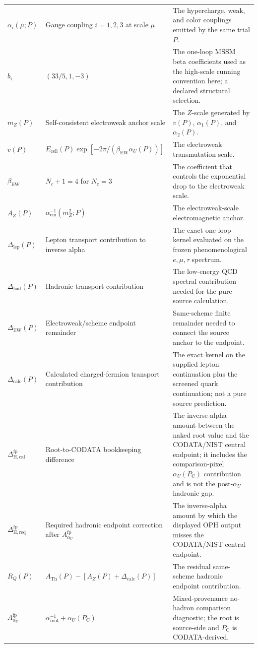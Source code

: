 \documentclass[11pt]{article}
\theoremstyle{remark}
\newcommand{\ATh}{A_{\mathrm{Th}}}
\newcommand{\AZ}{A_Z}
\newcommand{\Ppub}{P_{\mathrm C}}
\newcommand{\Rq}{R_Q}
\newcommand{\Dcalc}{\Delta_{\mathrm{calc}}}
\newcommand{\Dcalib}{\Delta_{\mathrm{H,cal}}}
\newcommand{\Dlep}{\Delta_{\mathrm{lep}}}
\newcommand{\Dhad}{\Delta_{\mathrm{had}}}
\newcommand{\DEW}{\Delta_{\mathrm{EW}}}
\newcommand{\Dhadreq}{\Delta_{\mathrm{H,req}}}
\newcommand{\Nc}{N_c}
\begin{document}
\begin{longtable}{@{}L{0.20\textwidth}L{0.32\textwidth}L{0.38\textwidth}@{}}
\(\alpha_i(\mu;P)\) & Gauge coupling \(i=1,2,3\) at scale \(\mu\) & The hypercharge, weak, and color couplings emitted by the same trial \(P\). \\
\(b_i\) & \((33/5,1,-3)\) & The one-loop MSSM beta coefficients used as the high-scale running convention here; a declared structural selection. \\
\(m_Z(P)\) & Self-consistent electroweak anchor scale & The \(Z\)-scale generated by \(v(P)\), \(\alpha_1(P)\), and \(\alpha_2(P)\). \\
\(v(P)\) & \(E_{\mathrm{cell}}(P)\exp[-2\pi/(\beta_{\mathrm{EW}}\alpha_U(P))]\) & The electroweak transmutation scale. \\
\(\beta_{\mathrm{EW}}\) & \(\Nc+1=4\) for \(\Nc=3\) & The coefficient that controls the exponential drop to the electroweak scale. \\
\(\AZ(P)\) & \(\alpha_{\mathrm{em}}^{-1}(m_Z^2;P)\) & The electroweak-scale electromagnetic anchor. \\
\(\Dlep(P)\) & Lepton transport contribution to inverse alpha & The exact one-loop kernel evaluated on the frozen phenomenological \(e,\mu,\tau\) spectrum. \\
\(\Dhad(P)\) & Hadronic transport contribution & The low-energy QCD spectral contribution needed for the pure source calculation. \\
\(\DEW(P)\) & Electroweak/scheme endpoint remainder & Same-scheme finite remainder needed to connect the source anchor to the endpoint. \\
\(\Dcalc(P)\) & Calculated charged-fermion transport contribution & The exact kernel on the supplied lepton continuation plus the screened quark continuation; not a pure source prediction. \\
\(\Dcalib^{\mathrm{fp}}\) & Root-to-CODATA bookkeeping difference & The inverse-alpha amount between the naked root value and the CODATA/NIST central endpoint; it includes the comparison-pixel \(\alpha_U(\Ppub)\) contribution and is not the post-\(\alpha_U\) hadronic gap. \\
\(\Dhadreq^{\mathrm{fp}}\) & Required hadronic endpoint correction after \(A_{\alpha_U}^{\mathrm{fp}}\) & The inverse-alpha amount by which the displayed OPH output misses the CODATA/NIST central endpoint. \\
\(\Rq(P)\) & \(\ATh(P)-[\AZ(P)+\Dcalc(P)]\) & The residual same-scheme hadronic endpoint contribution. \\
\(A_{\alpha_U}^{\mathrm{fp}}\) & \(\alpha_{\mathrm{root}}^{-1}+\alpha_U(\Ppub)\) & Mixed-provenance no-hadron comparison diagnostic; the root is source-side and \(\Ppub\) is CODATA-derived. \\

\end{longtable}
\end{document}
